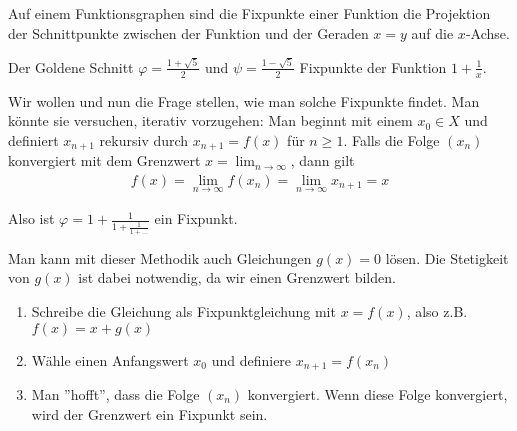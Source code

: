 Auf einem Funktionsgraphen sind die Fixpunkte einer Funktion die Projektion der Schnittpunkte zwischen der Funktion und der Geraden $x = y$ auf die $x$-Achse.
\begin{example}
Der Goldene Schnitt $\varphi = \frac{1+\sqrt{5}}{2}$ und $\psi = \frac{1-\sqrt{5}}{2}$ Fixpunkte der Funktion $1 + \frac{1}{x}$.
\begin{figure}[hbt!]
    \centering
\end{figure}
\end{example}

Wir wollen und nun die Frage stellen, wie man solche Fixpunkte findet. Man könnte sie versuchen, iterativ vorzugehen: Man beginnt mit einem $x_0 \in X$ und definiert $x_{n+1}$ rekursiv durch $x_{n+1} = f(x)$ für $n \geq 1$. Falls die Folge $(x_n)$ konvergiert mit dem Grenzwert $x = \lim_{n \to \infty}$, dann gilt 
\begin{align}\label{eq_fixpunkt}
    f(x) = \lim_{n \to \infty} f(x_n) = \lim_{n \to \infty} x_{n+1} = x    
\end{align}

\begin{example} Also ist $\varphi = 1+\frac{1}{1+\frac{1}{1+...}}$ ein Fixpunkt.
\end{example} 

Man kann mit dieser Methodik auch Gleichungen $g(x) = 0$ lösen. Die Stetigkeit von $g(x)$ ist dabei notwendig, da wir einen Grenzwert bilden.
\begin{enumerate}
    \item Schreibe die Gleichung als Fixpunktgleichung mit $x = f(x)$, also z.B. $f(x) = x+g(x)$
    \item Wähle einen Anfangswert $x_0$ und definiere $x_{n+1} = f(x_n)$
    \item Man ''hofft'', dass die Folge $(x_n)$ konvergiert. Wenn diese Folge konvergiert, wird der Grenzwert ein Fixpunkt sein.
\end{enumerate}

